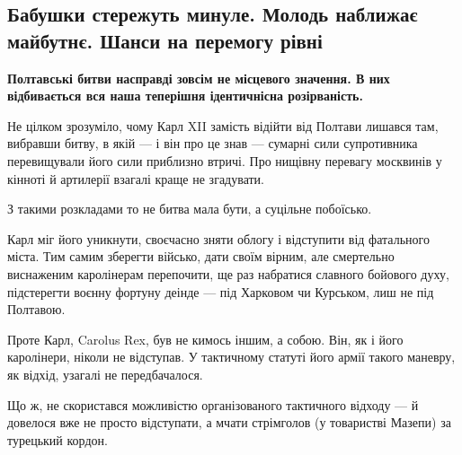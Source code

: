  
 
 
 
 

\subsection{Бабушки стережуть минуле. Молодь наближає майбутнє. Шанси на перемогу рівні}
\label{sec:20_11_2020.news.ua.gazeta.2.babushki_andruhovich}


\begin{leftbar}
	\bfseries
Полтавські битви насправді зовсім не місцевого значення. В них відбивається вся
наша теперішня ідентичнісна розірваність.
\end{leftbar}

Не цілком зрозуміло, чому Карл XII замість відійти від Полтави лишався там,
вибравши битву, в якій --- і він про це знав --- сумарні сили супротивника
перевищували його сили приблизно втричі. Про нищівну перевагу москвинів у
кінноті й артилерії взагалі краще не згадувати.

З такими розкладами то не битва мала бути, а суцільне побоїсько.

Карл міг його уникнути, своєчасно зняти облогу і відступити від фатального
міста. Тим самим зберегти військо, дати своїм вірним, але смертельно виснаженим
каролінерам перепочити, ще раз набратися славного бойового духу, підстерегти
воєнну фортуну деінде --- під Харковом чи Курськом, лиш не під Полтавою.

Проте Карл, Carolus Rex, був не кимось іншим, а собою. Він, як і його
каролінери, ніколи не відступав. У тактичному статуті його армії такого
маневру, як відхід, узагалі не передбачалося.

Що ж, не скористався можливістю організованого тактичного відходу --- й довелося
вже не просто відступати, а мчати стрімголов (у товаристві Мазепи) за турецький
кордон.

